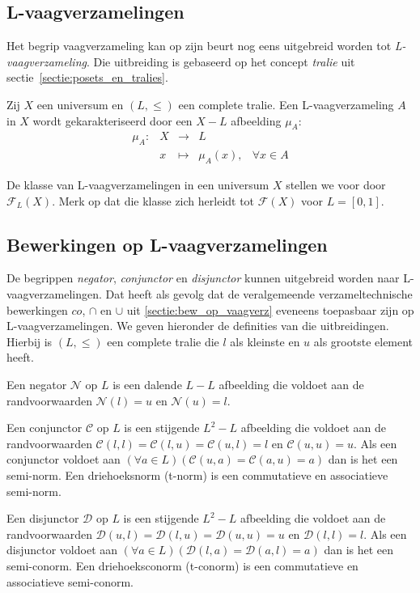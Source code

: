 \subsection{L-vaagverzamelingen}

Het begrip vaagverzameling kan op zijn beurt nog eens uitgebreid worden tot 
\emph{L-vaagverzameling}. Die uitbreiding is gebaseerd op het concept \emph{tralie}
uit sectie~\ref{sectie:posets_en_tralies}.
\begin{definitie}
Zij $X$ een universum en $(L,\le)$ een complete tralie. Een L-vaagverzameling $A$ in $X$ wordt
gekarakteriseerd door een $X - L$ afbeelding $\mu_A$:
\begin{displaymath}
\begin{array}{lllll}
\mu_A: 	& X & \to 		& L	& \\
		& x & \mapsto 	& \mu_A(x),		& \forall x \in A
\end{array}
\end{displaymath}
\end{definitie}
\noindent
De klasse van L-vaagverzamelingen in een universum $X$ stellen we voor door 
$\mathcal{F}_L(X)$. Merk op dat die klasse zich herleidt tot $\mathcal{F}(X)$ voor $L = [0,1]$.

\subsection{Bewerkingen op L-vaagverzamelingen}

De begrippen \emph{negator}, \emph{conjunctor} en 
\emph{disjunctor} kunnen uitgebreid worden naar L-vaag\-ver\-za\-me\-ling\-en. Dat heeft als 
gevolg dat de veralgemeende verzameltechnische bewerkingen $co$, $\cap$ en 
$\cup$ uit \ref{sectie:bew_op_vaagverz} eveneens toepasbaar zijn op L-vaagverzamelingen.
We geven hieronder de definities van die uitbreidingen.
Hierbij is $(L,\le)$ een complete tralie die $l$ als kleinste en $u$ als grootste element heeft.
\begin{definitie}
Een negator $\mathcal{N}$ op $L$ is een dalende $L - L$ afbeelding die voldoet
aan de randvoorwaarden $\mathcal{N}(l)=u$ en $\mathcal{N}(u)=l$. 
\end{definitie}
\begin{definitie}
Een conjunctor $\mathcal{C}$ op $L$ is een stijgende $L^2 - L$ afbeelding die voldoet aan de
randvoorwaarden $\mathcal{C}(l,l)=\mathcal{C}(l,u)=\mathcal{C}(u,l)=l$ en $\mathcal{C}(u,u)=u$. 
Als een conjunctor voldoet aan 
$(\forall a \in L)(\mathcal{C}(u,a)=\mathcal{C}(a,u)=a)$ dan is het een semi-norm.
Een driehoeksnorm (t-norm) is een commutatieve en associatieve semi-norm.
\end{definitie}
\begin{definitie}
Een disjunctor $\mathcal{D}$ op $L$ is een stijgende $L^2 - L$ afbeelding die voldoet
aan de randvoorwaarden $\mathcal{D}(u,l)=\mathcal{D}(l,u)=\mathcal{D}(u,u)=u$ en 
$\mathcal{D}(l,l)=l$. Als een disjunctor voldoet aan 
$(\forall a \in L)(\mathcal{D}(l,a)=\mathcal{D}(a,l)=a)$ dan is het een semi-conorm.
Een driehoeksconorm (t-conorm) is een commutatieve en associatieve semi-conorm.
\end{definitie}

